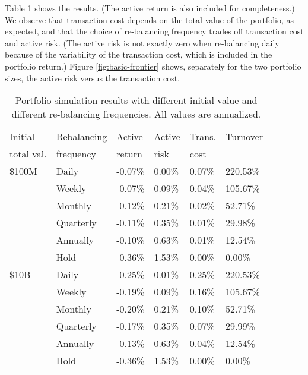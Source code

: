 \documentclass[openany]{article}  %
\begin{document}
Table \ref{tab:basic_example} shows the results.
(The active return is also included for completeness.)
We observe that transaction cost depends on the total value of
the portfolio, as expected,
and that the choice of re-balancing frequency trades off
transaction cost and active risk.
(The active risk is not exactly zero when
re-balancing daily because of the
variability of the transaction cost, which
is included in the portfolio return.)
Figure \ref{fig:basic-frontier} shows,
separately for the two portfolio sizes,
the active risk versus the transaction cost.

\begin{table}
\begin{center}
\begin{tabular}{ll|llll}
\toprule
Initial    & Rebalancing    & Active  &  Active  &Trans.& Turnover  \\
total val.   & frequency    &  return &  risk&  cost& \\
\midrule
\$100M & Daily &        -0.07\% &       0.00\% &        0.07\% &  220.53\% \\
    & Weekly &        -0.07\% &       0.09\% &        0.04\% &  105.67\% \\
    & Monthly &        -0.12\% &       0.21\% &        0.02\% &   52.71\% \\
    & Quarterly &        -0.11\% &       0.35\% &        0.01\% &   29.98\% \\
    & Annually &        -0.10\% &       0.63\% &        0.01\% &   12.54\% \\
    & Hold &        -0.36\% &       1.53\% &        0.00\% &    0.00\% \\
\$10B & Daily &        -0.25\% &       0.01\% &        0.25\% &  220.53\% \\
    & Weekly &        -0.19\% &       0.09\% &        0.16\% &  105.67\% \\
    & Monthly &        -0.20\% &       0.21\% &        0.10\% &   52.71\% \\
    & Quarterly &        -0.17\% &       0.35\% &        0.07\% &   29.99\% \\
    & Annually &        -0.13\% &       0.63\% &        0.04\% &   12.54\% \\
    & Hold &        -0.36\% &       1.53\% &        0.00\% &    0.00\% \\
\bottomrule
\end{tabular}
\end{center}
\caption{Portfolio simulation results with different initial value
and different re-balancing frequencies. All values are annualized.}
\label{tab:basic_example}
\end{table}
\end{document}
